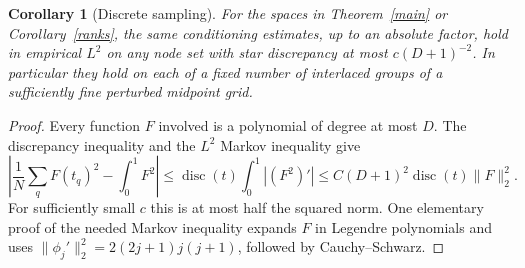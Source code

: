 \documentclass[11pt]{article}
\newtheorem{corollary}{Corollary}
\begin{document}
\begin{corollary}[Discrete sampling]
For the spaces in Theorem~\ref{main} or Corollary~\ref{ranks}, the same
conditioning estimates, up to an absolute factor, hold in empirical
$L^2$ on any node set with star discrepancy at most $c(D+1)^{-2}$.
In particular they hold on each of a fixed number of interlaced groups
of a sufficiently fine perturbed midpoint grid.
\end{corollary}
\begin{proof}
Every function $F$ involved is a polynomial of degree at most $D$.
The discrepancy inequality and the $L^2$ Markov inequality give
\[
 \left|\frac1N\sum_qF(t_q)^2-\int_0^1F^2\right|
 \le\operatorname{disc}(t)\int_0^1|(F^2)'|
 \le C(D+1)^2\operatorname{disc}(t)\|F\|_2^2.
\]
For sufficiently small $c$ this is at most half the squared norm.
One elementary proof of the needed Markov inequality expands $F$ in
Legendre polynomials and uses
$\|\phi_j'\|_2^2=2(2j+1)j(j+1)$, followed by Cauchy--Schwarz.
\end{proof}
\end{document}
